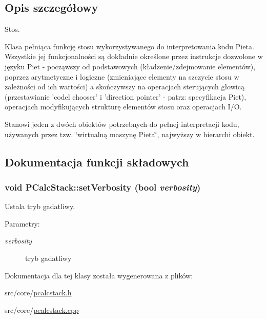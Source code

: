 \subsection{Opis szczegółowy}
Stos. 

Klasa pełniąca funkcję stosu wykorzystywanego do interpretowania kodu Pieta. Wszystkie jej funkcjonalności są dokładnie określone przez instrukcje dozwolone w języku Piet - począwszy od podstawowych (kładzenie/zdejmowanie elementów), poprzez arytmetyczne i logiczne (zmieniające elementy na szczycie stosu w zależności od ich wartości) a skończywszy na operacjach sterujących głowicą (przestawianie 'codel chooser' i 'direction pointer' - patrz: specyfikacja Piet), operacjach modyfikujących strukturę elementów stosu oraz operacjach I/O.

Stanowi jeden z dwóch obiektów potrzebnych do pełnej interpretacji kodu, używanych przez tzw. \char`\"{}wirtualną maszynę Pieta\char`\"{}, najwyższy w hierarchi obiekt. 

\subsection{Dokumentacja funkcji składowych}
\hypertarget{classPCalcStack_6a831a20f4dec457de9f880202cf2e33}{
\subsubsection[{setVerbosity}]{\setlength{\rightskip}{0pt plus 5cm}void PCalcStack::setVerbosity (bool {\em verbosity})}}
\label{classPCalcStack_6a831a20f4dec457de9f880202cf2e33}


Ustala tryb gadatliwy. \begin{Desc}
\item[Parametry:]
\begin{description}
\item[{\em verbosity}]tryb gadatliwy \end{description}
\end{Desc}


Dokumentacja dla tej klasy została wygenerowana z plików:\begin{CompactItemize}
\item 
src/core/\hyperlink{pcalcstack_8h}{pcalcstack.h}\item 
src/core/\hyperlink{pcalcstack_8cpp}{pcalcstack.cpp}\end{CompactItemize}
